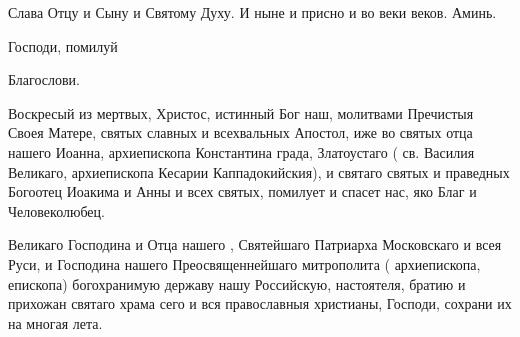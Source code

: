 \begin{mymulticols}
 Слава Отцу и Сыну и Святому Духу. И ныне и присно и во веки веков. Аминь. 

 Господи, помилуй 

 Благослови. 


 Воскресый из мертвых, Христос, истинный Бог наш, молитвами Пречистыя Своея Матере, святых славных и всехвальных Апостол, иже во святых отца нашего Иоанна, архиепископа Константина града, Златоустаго ( св. Василия Великаго, архиепископа Кесарии Каппадокийския), и святаго  святых и праведных Богоотец Иоакима и Анны и всех святых, помилует и спасет нас, яко Благ и Человеколюбец.


 Великаго Господина и Отца нашего , Святейшаго Патриарха Московскаго и всея Руси, и Господина нашего Преосвященнейшаго  митрополита ( архиепископа,  епископа)  богохранимую державу нашу Российскую, настоятеля, братию и прихожан святаго храма сего и вся православныя христианы, Господи, сохрани их на многая лета.



\end{mymulticols}

\mychapterending
